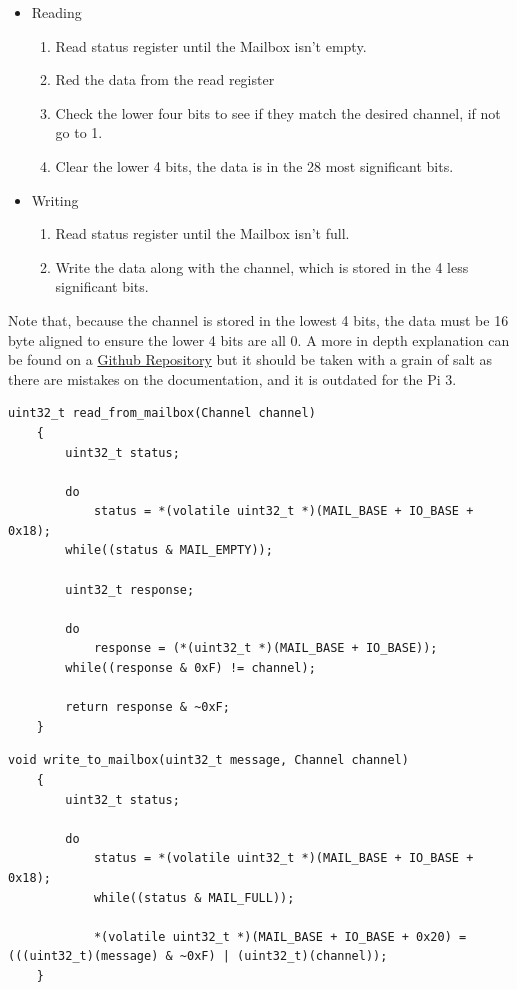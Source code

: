 \documentclass[12pt, svgnames]{book}
\begin{document}
\begin{itemize}
	\item Reading
	\begin{enumerate}
		\item Read status register until the Mailbox isn't empty.
		\item Red the data from the read register
		\item Check the lower four bits to see if they match the desired channel, if not go to 1.
		\item Clear the lower 4 bits, the data is in the 28 most significant bits.
	\end{enumerate}
	\item Writing
	\begin{enumerate}
		\item Read status register until the Mailbox isn't full.
		\item Write the data along with the channel, which is stored in the 4 less significant bits.
	\end{enumerate}
\end{itemize}

Note that, because the channel is stored in the lowest 4 bits, the data must be 16 byte aligned to ensure the lower 4 bits are all 0. A more in depth explanation can be found on a \href{https://github.com/raspberrypi/firmware/wiki/Accessing-mailboxes}{Github Repository} but it should be taken with a grain of salt as there are mistakes on the documentation, and it is outdated for the Pi 3.

\newpage

\begin{lstlisting}[style=C, title = Reading]
	uint32_t read_from_mailbox(Channel channel)
	{
		uint32_t status;
		
		do
			status = *(volatile uint32_t *)(MAIL_BASE + IO_BASE + 0x18);
		while((status & MAIL_EMPTY));
		
		uint32_t response;
		
		do
			response = (*(uint32_t *)(MAIL_BASE + IO_BASE));
		while((response & 0xF) != channel);
		
		return response & ~0xF;
	}
\end{lstlisting}

\begin{lstlisting}[style=C, title = Writing]
	void write_to_mailbox(uint32_t message, Channel channel)
	{
		uint32_t status;
		
		do
			status = *(volatile uint32_t *)(MAIL_BASE + IO_BASE + 0x18);
			while((status & MAIL_FULL));
			
			*(volatile uint32_t *)(MAIL_BASE + IO_BASE + 0x20) = (((uint32_t)(message) & ~0xF) | (uint32_t)(channel));
	}
\end{lstlisting}
\end{document}
